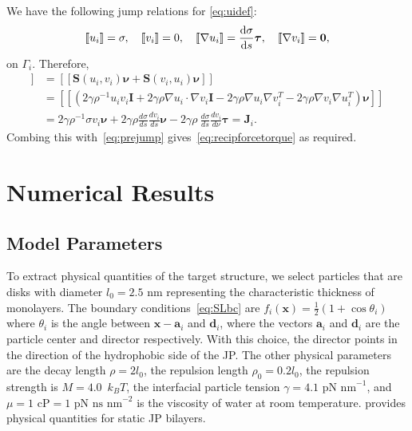 \documentclass[lineno]{jfm}
\renewcommand{\aa}{\mathbf{a}}
\newcommand{\dd}{\mathbf{d}}
\newcommand{\JJ}{\mathbf{J}}
\newcommand{\nnu}{\boldsymbol{\nu}}
\newcommand{\ttau}{\boldsymbol{\tau}}
\newcommand{\xx}{\mathbf{x}}
\newcommand{\jump}[1]{[\![ #1 ]\!]}
\begin{document}
We have the following jump relations for \eqref{eq:uidef}: 
\begin{equation}
\label{eq:DLjump}
\jump{u_i} = \sigma, \quad
\jump{v_i} = 0, \quad
\jump{\nabla u_i} = \frac{\dif \sigma}{\dif s}\ttau,\quad
\jump{\nabla v_i} = \mathbf{0},
\end{equation}
on $\Gamma_i$. Therefore,
\begin{align*}
  \jump{{\bf T}_2\nnu}   &= \jump{\mathbf{S}(u_i,v_i)\nnu  +\mathbf{S}(v_i,u_i)\nnu} \\
  &= \jump{( 2\gamma\rho^{-1} u_i v_i \mathbf{I} + 2\gamma\rho \nabla u_i \cdot \nabla v_i \mathbf{I} 
- 2\gamma\rho \nabla u_i  \nabla v_i^T - 2\gamma\rho \nabla v_i \nabla u_i^T)  \nnu}\\
&= 2\gamma\rho^{-1} \sigma v_i \nnu + 2\gamma\rho \frac{d\sigma }{ds}\frac{dv_i }{ds} \nnu
- 2\gamma\rho \ \frac{d\sigma }{ds} \frac{dv_i }{d\nu} \ttau = \JJ_i.
\end{align*}
Combing this with~\eqref{eq:prejump} gives~\eqref{eq:recipforcetorque}
as required. 



\section{\label{results}Numerical Results}


\subsection{Model Parameters}
To extract physical quantities of the target structure, we select
particles that are disks with diameter $l_0 = 2.5$ nm representing the
characteristic thickness of monolayers. The boundary
conditions~\eqref{eq:SLbc} are $f_i(\xx) = \tfrac{1}{2}(1 + \cos
\theta_i)$ where $\theta_i$ is the angle between $\xx - \aa_i$ and
$\dd_i$, where the vectors $\aa_i$ and $\dd_i$ are the particle center
and director respectively. With this choice, the director points in the
direction of the hydrophobic side of the JP. The other physical
parameters are the decay length $\rho = 2 l_0$, the repulsion length
$\rho_0 = 0.2l_0$, the repulsion strength is $M=4.0$~$k_BT$, the
interfacial particle tension $\gamma = \text{4.1 pN nm}^{-1}$, and $\mu
= \text{1 cP} = \text{1 pN ns nm}^{-2}$ is the viscosity of water at
room temperature. \cite{Fu20} provides physical quantities for static JP
bilayers.
\end{document}

